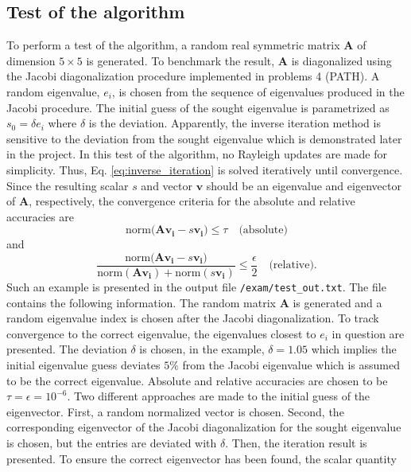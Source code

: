 \documentclass{article}
\begin{document}
	\subsection*{Test of the algorithm}
	To perform a test of the algorithm, a random real symmetric matrix $\mathbf{A}$ of dimension $5\times 5$ is generated. To benchmark the result, $\mathbf{A}$ is diagonalized using the Jacobi diagonalization procedure implemented in problems 4 (PATH). A random eigenvalue, $e_{i}$, is chosen from the sequence of eigenvalues produced in the Jacobi procedure. The initial guess of the sought eigenvalue is parametrized as $s_{0} = \delta e_{i}$ where $\delta$ is the deviation. Apparently, the inverse iteration method is sensitive to the deviation from the sought eigenvalue which is demonstrated later in the project. In this test of the algorithm, no Rayleigh updates are made for simplicity. Thus, Eq. \ref{eq:inverse_iteration} is solved iteratively until convergence. Since the resulting scalar $s$ and vector $\mathbf{v}$ should be an eigenvalue and eigenvector of $\mathbf{A}$, respectively, the convergence criteria for the absolute and relative accuracies are
	\begin{equation}
		\textrm{norm}\Big(\mathbf{A}\mathbf{v_{i}} - s\mathbf{v_{i}}\Big)\leq\tau\quad\textrm{(absolute)}
	\end{equation}
	and
	\begin{equation}
	\frac{\textrm{norm}\Big(\mathbf{A}\mathbf{v_{i}} - s\mathbf{v_{i}}\Big)}{\textrm{norm}(\mathbf{A}\mathbf{v_{i}}) + \textrm{norm}(s\mathbf{v_{i}})}\leq\frac{\epsilon}{2}\quad\textrm{(relative)}.
	\label{eq:relative_error}
	\end{equation}
	Such an example is presented in the output file \texttt{/exam/test\_out.txt}. The file contains the following information. The random matrix $\mathbf{A}$ is generated and a random eigenvalue index is chosen after the Jacobi diagonalization. To track convergence to the correct eigenvalue, the eigenvalues closest to $e_{i}$ in question are presented. The deviation $\delta$ is chosen, in the example, $\delta = 1.05$ which implies the initial eigenvalue guess deviates $5\%$ from the Jacobi eigenvalue which is assumed to be the correct eigenvalue. Absolute and relative accuracies are chosen to be $\tau=\epsilon=10^{-6}$. Two different approaches are made to the initial guess of the eigenvector. First, a random normalized vector is chosen. Second, the corresponding eigenvector of the Jacobi diagonalization for the sought eigenvalue is chosen, but the entries are deviated with $\delta$. Then, the iteration result is presented. To ensure the correct eigenvector has been found, the scalar quantity
\end{document}
